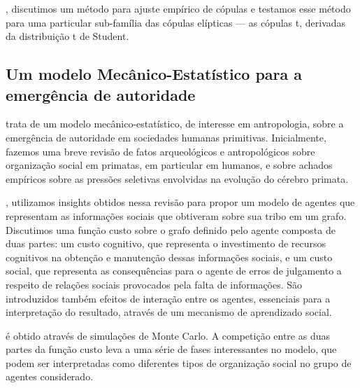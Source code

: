 , discutimos um método para ajuste empírico de cópulas e testamos esse método para uma particular sub-família das cópulas elípticas --- as cópulas t, derivadas da distribuição t de Student. 


\subsection{Um modelo Mecânico-Estatístico para a emergência de autoridade}

 trata de um modelo mecânico-estatístico, de interesse em antropologia, sobre a emergência de autoridade em sociedades humanas primitivas. Inicialmente, fazemos uma breve revisão de fatos arqueológicos e antropológicos sobre organização social em primatas, em particular em humanos, e sobre achados empíricos sobre as pressões seletivas envolvidas na evolução do cérebro primata. 

, utilizamos insights obtidos nessa revisão para propor um modelo de agentes que representam as informações sociais que obtiveram sobre sua tribo em um grafo. Discutimos uma função custo sobre o grafo definido pelo agente composta de duas partes: um custo cognitivo, que representa o investimento de recursos cognitivos na obtenção e manutenção dessas informações sociais, e um custo social, que representa as consequências para o agente de erros de julgamento a respeito de relações sociais provocados pela falta de informações. São introduzidos também efeitos de interação entre os agentes, essenciais para a interpretação do resultado, através de um mecanismo de aprendizado social. 

 é obtido através de simulações de Monte Carlo. A competição entre as duas partes da função custo leva a uma série de fases interessantes no modelo, que podem ser interpretadas como diferentes tipos de organização social no grupo de agentes considerado. 